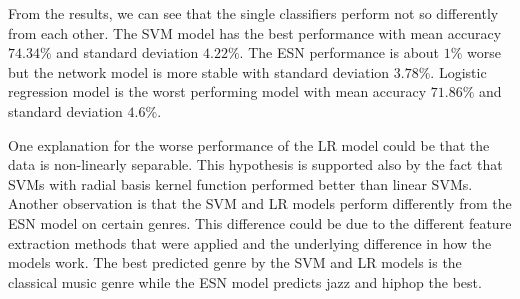 \documentclass[a4paper,11pt,oneside]{article}
\begin{document}
\begin{table}[H]
  \centering
  \caption{Classification Accuracy for the Ensemble System}
  \label{ensembletable}
  \end{table}
  From the results, we can see that the single classifiers perform not so differently from
  each other. The SVM model has the best performance with mean accuracy $74.34\%$ and standard deviation
  $4.22\%$. The ESN performance is about $1\%$ worse but the network model is more stable 
  with standard deviation $3.78\%$. Logistic regression model is the worst performing model with
  mean accuracy $71.86\%$ and standard deviation $4.6\%$. 
  
  One explanation for the worse performance
  of the LR model could be that the data is non-linearly separable. This hypothesis is supported also
  by the fact that SVMs with radial basis kernel function performed better than linear SVMs.
  Another observation is that the SVM and LR models perform differently from the ESN model on certain genres.
  This difference could be due to the different feature
  extraction methods that were applied and the underlying difference in how the models work.
  The best predicted genre by the SVM and LR models is the classical music genre while the ESN model predicts
  jazz and hiphop the best.
  
\end{document}
